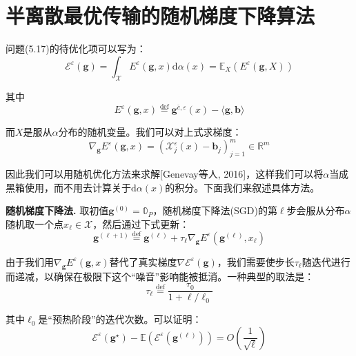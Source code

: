 \documentclass[cn,10pt,math=newtx,citestyle=gb7714-2015,bibstyle=gb7714-2015]{elegantbook}
\begin{document}
\section{半离散最优传输的随机梯度下降算法}

问题(5.17)的待优化项可以写为：
\begin{equation}
    \mathcal{E}^\varepsilon(\mathbf{g}) = \int_\mathcal{X} E^\varepsilon (\mathbf{g},x) \text{d}\alpha(x) = \mathbb{E}_X(E^\varepsilon(\mathbf{g},X))
\end{equation}

其中
\begin{equation}
    E^\varepsilon (\mathbf{g},x) \overset{\text{def}}{=} \mathbf{g}^{\bar c, \varepsilon}(x) - \langle \mathbf{g,b} \rangle
\end{equation}

而$X$是服从$\alpha$分布的随机变量。我们可以对上式求梯度：
\begin{equation}
    \nabla_\mathbf{g} E^\varepsilon(\mathbf{g},x) = (\mathcal{X}_j^\varepsilon(x) - \mathbf{b}_j)_{j=1}^m \in \mathbb{R}^m
\end{equation}

因此我们可以用随机优化方法来求解[Genevay等人, 2016]，这样我们可以将$\alpha$当成黑箱使用，而不用去计算关于$\text{d}\alpha(x)$的积分。下面我们来叙述具体方法。

\vspace{1em}

\textbf{随机梯度下降法.} 取初值$\mathbf{g}^{(0)}=\mathbb{0}_P$，随机梯度下降法(SGD)的第$\ell$步会服从分布$\alpha$随机取一个点$x_\ell\in\mathcal{X}$，然后通过下式更新：
\begin{equation}
    \mathbf{g}^{(\ell+1)} \overset{\text{def}}{=} \mathbf{g}^{(\ell)} + \tau_\ell \nabla_\mathbf{g} E^\varepsilon(\mathbf{g}^{(\ell)},x_\ell)
\end{equation}

由于我们用$\nabla_\mathbf{g} E^\varepsilon(\mathbf{g},x)$替代了真实梯度$\nabla \mathcal{E}^\varepsilon(\mathbf{g})$，我们需要使步长$\tau_\ell$随迭代进行而递减，以确保在极限下这个“噪音”影响能被抵消。一种典型的取法是：
\begin{equation}
    \tau_\ell \overset{\text{def}}{=} \frac{\tau_0}{1+\ell/\ell_0}
\end{equation}

其中$\ell_0$是“预热阶段”的迭代次数。可以证明：
\begin{equation}
    \mathcal{E}^\varepsilon(\mathbf{g}^\star)-\mathbb{E}(\mathcal{E}^\varepsilon(\mathbf{g}^{(\ell)})) = O\left(\frac{1}{\sqrt{\ell}}\right)
\end{equation}
\end{document}
